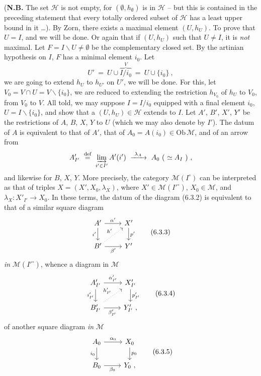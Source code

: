 \documentclass[11pt]{article}
\newcommand{\printedpage}[1]{\marginpar{\footnotesize p.~#1}}
\newcommand{\msp}[1]{\marginpar{\footnotesize [#1]}}
\begin{document}
\printedpage{55}\msp{page 110}
(\textbf{N.B.} The set $\mathcal{H}$ is not empty, for $(\emptyset, h_{\emptyset})$ is in $\mathcal{H}$ -- but this is contained in the preceding statement that every totally ordered subset of $\mathcal{H}$ has a least upper bound in it \dots). By Zorn, there exists a maximal element $(U, h_U)$. To prove that $U = I$, and we will be done. Or again that if $(U, h_U)$ such that $U \neq I$, it is \textit{not} maximal. Let $F = I\backslash U \neq \emptyset$ be the complementary closed set. By the artinian hypothesis on $I$, $F$ has a minimal element $i_0$. Let
\[
U' \ =\ U \cup \overbrace{I/i_0}^{V} \ =\ U \cup \{i_0\}\ ,
\]
we are going to extend $h_U$ to $h_{U'}$ on $U'$, we will be done. For this, let $V_0 = V \cap U = V\backslash\{i_0\}$, we are reduced to extending the restriction $h_{V_0}$ of $h_U$ to $V_0$, from $V_0$ to $V$. All told, we may suppose $I = I/i_0$ equipped with a final element $i_0$, $U = I\backslash\{i_0\}$, and show that a $(U, h_U) \in \mathcal{H}$ extends to $I$. Let $A'$, $B'$, $X'$, $Y'$ be the restrictions of $A$, $B$, $X$, $Y$ to $U$ (which we may also denote by $I'$). The datum of $A$ %
is equivalent to that of $A'$, that of $A_0 = A(i_0) \in \mathrm{Ob}\,\mathcal{M}$, and of an arrow from
\[
A'_{I'} \ \overset{\text{def}}{=}\ \varinjlim\limits_{i' \in I'} A'(i') \ \xrightarrow{\ \lambda_A\ }\ A_0\ (\ \simeq A_I\ )\ ,
\]
\msp{page 111}and likewise for $B$, $X$, $Y$. More precisely, the category $\mathcal{M}(I^{\circ})$ can be interpreted as that of triples $X = (X', X_0, \lambda_X)$, where $X' \in \mathcal{M}(I'^{\circ})$, $X_0 \in \mathcal{M}$, and $\lambda_X : X'_{I'} \longrightarrow X_0$. In these terms, the datum of the diagram (6.3.2) is equivalent to that of a similar square diagram
\[
\begin{tikzcd}
A' \arrow[r, "\alpha'"] \arrow[d, "i'"'] & X' \arrow[d, "p'"] \\
B' \arrow[r, "\beta'"'] \arrow[ur, dotted, "h'"] & Y'
\end{tikzcd}
\tag*{(6.3.3)}
\]
\textit{in} $\mathcal{M}(I'^{\circ})$, whence a diagram in $\mathcal{M}$
\[
\begin{tikzcd}
A'_{I'} \arrow[r, "\alpha'_{I'}"] \arrow[d, "i'_{I'}"'] & X'_{I'} \arrow[d, "p'_{I'}"] \\
B'_{I'} \arrow[r, "\beta'_{I'}"'] \arrow[ur, dotted, "h'_{I'}"] & Y'_{I'}\ ,
\end{tikzcd}
\tag*{(6.3.4)}
\]
of another square diagram \textit{in} $\mathcal{M}$
\[
\begin{tikzcd}
A_0 \arrow[r, "\alpha_0"] \arrow[d, "i_0"'] & X_0 \arrow[d, "p_0"] \\
B_0 \arrow[r, "\beta_0"'] & Y_0\ ,
\end{tikzcd}
\tag*{(6.3.5)}
\]
\end{document}
